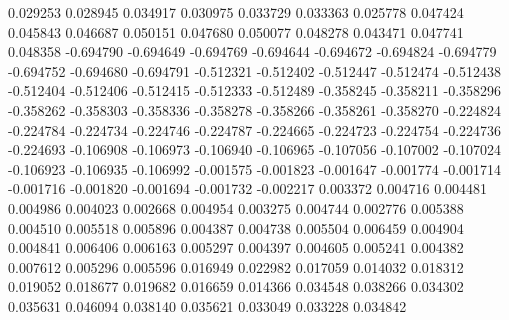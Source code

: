 0.029253
0.028945
0.034917
0.030975
0.033729
0.033363
0.025778
0.047424
0.045843
0.046687
0.050151
0.047680
0.050077
0.048278
0.043471
0.047741
0.048358
-0.694790
-0.694649
-0.694769
-0.694644
-0.694672
-0.694824
-0.694779
-0.694752
-0.694680
-0.694791
-0.512321
-0.512402
-0.512447
-0.512474
-0.512438
-0.512404
-0.512406
-0.512415
-0.512333
-0.512489
-0.358245
-0.358211
-0.358296
-0.358262
-0.358303
-0.358336
-0.358278
-0.358266
-0.358261
-0.358270
-0.224824
-0.224784
-0.224734
-0.224746
-0.224787
-0.224665
-0.224723
-0.224754
-0.224736
-0.224693
-0.106908
-0.106973
-0.106940
-0.106965
-0.107056
-0.107002
-0.107024
-0.106923
-0.106935
-0.106992
-0.001575
-0.001823
-0.001647
-0.001774
-0.001714
-0.001716
-0.001820
-0.001694
-0.001732
-0.002217
0.003372
0.004716
0.004481
0.004986
0.004023
0.002668
0.004954
0.003275
0.004744
0.002776
0.005388
0.004510
0.005518
0.005896
0.004387
0.004738
0.005504
0.006459
0.004904
0.004841
0.006406
0.006163
0.005297
0.004397
0.004605
0.005241
0.004382
0.007612
0.005296
0.005596
0.016949
0.022982
0.017059
0.014032
0.018312
0.019052
0.018677
0.019682
0.016659
0.014366
0.034548
0.038266
0.034302
0.035631
0.046094
0.038140
0.035621
0.033049
0.033228
0.034842
